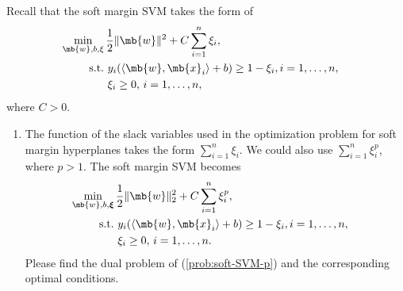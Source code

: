 \begin{exercise}
    Recall that the soft margin SVM takes the form of
    \begin{align}\label{prob:soft-SVM-2}
        \min_{\mb{w},b,\xi}\, & \frac{1}{2}\|\mb{w}\|^2+C\sum_{i=1}^n\xi_i,                       \\ \nonumber
        {\rm s.t.\,}          & \,y_i(\langle\mb{w},\mb{x}_i\rangle+b)\geq1-\xi_i,i=1,\ldots,n, & \\ \nonumber
                              & \,\xi_i\geq0,\,i=1,\ldots,n,
    \end{align}
    where $C>0$.
    \begin{enumerate}
        \item The function of the slack variables used in the optimization problem for soft margin hyperplanes takes the form $\sum_{i=1}^n \xi_i$. We could also use $\sum_{i=1}^n \xi_i^p$, where $p>1$. The soft margin SVM becomes
            \begin{align}\label{prob:soft-SVM-p}
                \min_{\mb{w},b,\boldsymbol{\xi}}\, & \frac{1}{2}\|\mb{w}\|^2_2+C\sum_{i=1}^n\xi_i^p,                   \\ \nonumber
                {\rm s.t.\,}                       & \,y_i(\langle\mb{w},\mb{x}_i\rangle+b)\geq1-\xi_i,i=1,\ldots,n, & \\ \nonumber
                                                   & \,\xi_i\geq0,\,i=1,\ldots,n.
            \end{align}
            Please find the dual problem of (\ref{prob:soft-SVM-p}) and the corresponding optimal conditions.
    \end{enumerate}


\end{exercise}
